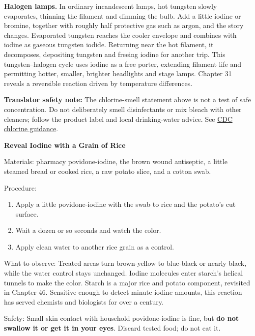 \textbf{Halogen lamps.} In ordinary incandescent lamps, hot tungsten slowly evaporates, thinning the filament and dimming the bulb. Add a little iodine or bromine, together with roughly half protective gas such as argon, and the story changes. Evaporated tungsten reaches the cooler envelope and combines with iodine as gaseous tungsten iodide. Returning near the hot filament, it decomposes, depositing tungsten and freeing iodine for another trip. This tungsten--halogen cycle uses iodine as a free porter, extending filament life and permitting hotter, smaller, brighter headlights and stage lamps. Chapter 31 reveals a reversible reaction driven by temperature differences.

\textbf{Translator safety note:} The chlorine-smell statement above is not a test of safe concentration. Do not deliberately smell disinfectants or mix bleach with other cleaners; follow the product label and local drinking-water advice. See \href{https://www.cdc.gov/chemical-emergencies/chemical-fact-sheets/chlorine.html}{CDC chlorine guidance}.

\begin{shiyan}
\textbf{Reveal Iodine with a Grain of Rice}

Materials: pharmacy povidone-iodine, the brown wound antiseptic, a little steamed bread or cooked rice, a raw potato slice, and a cotton swab.

Procedure:
\begin{enumerate}[itemsep=1pt]
\item Apply a little povidone-iodine with the swab to rice and the potato's cut surface.
\item Wait a dozen or so seconds and watch the color.
\item Apply clean water to another rice grain as a control.
\end{enumerate}

What to observe: Treated areas turn brown-yellow to blue-black or nearly black, while the water control stays unchanged. Iodine molecules enter starch's helical tunnels to make the color. Starch is a major rice and potato component, revisited in Chapter 46. Sensitive enough to detect minute iodine amounts, this reaction has served chemists and biologists for over a century.

Safety: Small skin contact with household povidone-iodine is fine, but \textbf{do not swallow it or get it in your eyes}. Discard tested food; do not eat it.
\end{shiyan}

